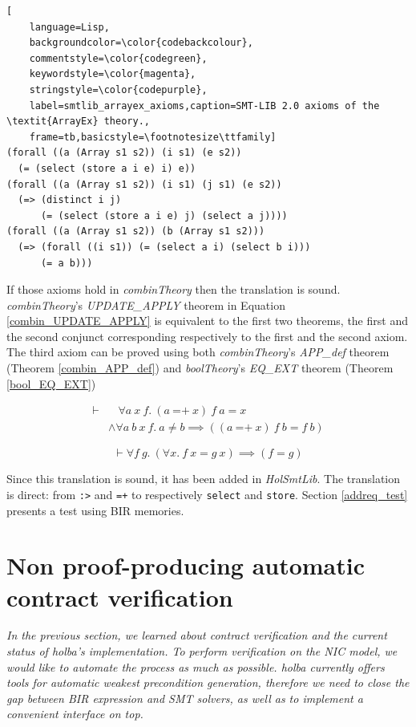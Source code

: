 \documentclass{kththesis}
\begin{document}
{\begin{lstlisting}[
    language=Lisp,
    backgroundcolor=\color{codebackcolour},
    commentstyle=\color{codegreen},
    keywordstyle=\color{magenta},
    stringstyle=\color{codepurple},
    label=smtlib_arrayex_axioms,caption=SMT-LIB 2.0 axioms of the \textit{ArrayEx} theory.,
    frame=tb,basicstyle=\footnotesize\ttfamily]
(forall ((a (Array s1 s2)) (i s1) (e s2))
  (= (select (store a i e) i) e)) 
(forall ((a (Array s1 s2)) (i s1) (j s1) (e s2))
  (=> (distinct i j)
      (= (select (store a i e) j) (select a j))))
(forall ((a (Array s1 s2)) (b (Array s1 s2)))
  (=> (forall ((i s1)) (= (select a i) (select b i)))
      (= a b)))
\end{lstlisting}

If those axioms hold in \textit{combinTheory} then the translation is sound. \textit{combinTheory}'s \textit{UPDATE\_APPLY} theorem in Equation \ref{combin_UPDATE_APPLY} is equivalent to the first two theorems, the first and the second conjunct corresponding respectively to the first and the second axiom. The third axiom can be proved using both \textit{combinTheory}'s \textit{APP\_def} theorem (Theorem \ref{combin_APP_def}) and \textit{boolTheory}'s \textit{EQ\_EXT} theorem (Theorem \ref{bool_EQ_EXT})

\begin{equation}
    \begin{split}
        \vdash &  ~~~~ \forall a~x~f.~(a~\text{=+}~x)~f~a = x\\
               & \land \forall a~b~x~f.~a \neq b \implies ((a~\text{=+}~x)~f~b = f~b)
    \end{split}
    \label{combin_UPDATE_APPLY}
\end{equation}

\begin{equation}
    \vdash \forall f~g.~(\forall x.~f~x = g~x) \implies (f = g)
    \label{bool_EQ_EXT}
\end{equation}

Since this translation is sound, it has been added in \textit{HolSmtLib}. The translation is direct: from \texttt{:>} and \texttt{=+} to respectively \texttt{select} and \texttt{store}. Section \ref{addreq_test} presents a test using BIR memories.



\chapter{Non proof-producing automatic contract verification} \label{impl-non-pp-wp-lib}
\vspace{-1cm}
\textit{In the previous section, we learned about contract verification and the current status of \gls{holba}'s implementation. To perform verification on the \gls{NIC} model, we would like to automate the process as much as possible. \gls{holba} currently offers tools for automatic weakest precondition generation, therefore we need to close the gap between BIR expression and SMT solvers, as well as to implement a convenient interface on top.}

}
\end{document}

